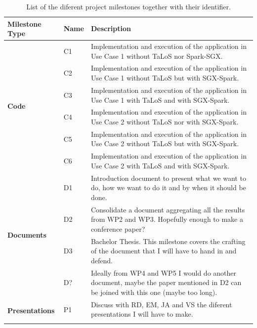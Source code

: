 \documentclass{article}
\begin{document}
\begin{table}[h!]
\centering
\begin{tabular}{llp{12cm}}
\hline
\textbf{Milestone Type} & \textbf{Name} & \textbf{Description} \\[3pt]
\hline \hline
\multirow{6}{*}{\textbf{Code}} & C1 & Implementation and execution of the application in Use Case 1 without TaLoS nor Spark-SGX. \\[3pt]
& C2 & Implementation and execution of the application in Use Case 1 without TaLoS but with SGX-Spark. \\[3pt]
& C3 & Implementation and execution of the application in Use Case 1 with TaLoS and with SGX-Spark. \\[3pt]
& C4 & Implementation and execution of the application in Use Case 2 without TaLoS nor with SGX-Spark. \\[3pt]
& C5 & Implementation and execution of the application in Use Case 2 without TaLoS but with SGX-Spark. \\[3pt]
& C6 & Implementation and execution of the application in Use Case 2 with TaLoS and with SGX-Spark. \\[3pt] \hline
\multirow{4}{*}{\textbf{Documents}} & D1 & Introduction document to present what we want to do, how we want to do it and by when it should be done. \\[3pt]
 & D2 & Consolidate a document aggregating all the results from WP2 and WP3. Hopefully enough to make a conference paper? \\[3pt]
 & D3 & Bachelor Thesis. This milestone covers the crafting of the document that I will have to hand in and defend. \\[3pt]
 & D? & Ideally from WP4 and WP5 I would do another document, maybe the paper mentioned in D2 can be joined with this one (maybe too long). \\[3pt] \hline
\multirow{2}{*}{\textbf{Presentations}} & P1 & Discuss with RD, EM, JA and VS the diferent presentations I will have to make. \\[3pt]
 & & \\[3pt]
\hline
\end{tabular}
\caption{List of the diferent project milestones together with their identifier. \label{table:milestones}}
\end{table}
\end{document}
